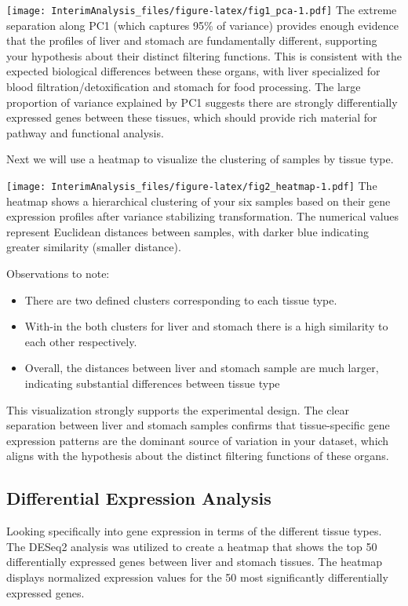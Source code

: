 \documentclass[
]{article}
\providecommand{\tightlist}{%
  \setlength{\itemsep}{0pt}\setlength{\parskip}{0pt}}
\begin{document}
\texttt{[image: InterimAnalysis\_files/figure-latex/fig1\_pca-1.pdf]} The
extreme separation along PC1 (which captures 95\% of variance) provides
enough evidence that the profiles of liver and stomach are fundamentally
different, supporting your hypothesis about their distinct filtering
functions. This is consistent with the expected biological differences
between these organs, with liver specialized for blood
filtration/detoxification and stomach for food processing. The large
proportion of variance explained by PC1 suggests there are strongly
differentially expressed genes between these tissues, which should
provide rich material for pathway and functional analysis.

Next we will use a heatmap to visualize the clustering of samples by
tissue type.

\texttt{[image: InterimAnalysis\_files/figure-latex/fig2\_heatmap-1.pdf]}
The heatmap shows a hierarchical clustering of your six samples based on
their gene expression profiles after variance stabilizing
transformation. The numerical values represent Euclidean distances
between samples, with darker blue indicating greater similarity (smaller
distance).

Observations to note:

\begin{itemize}
\tightlist
\item
  There are two defined clusters corresponding to each tissue type.
\item
  With-in the both clusters for liver and stomach there is a high
  similarity to each other respectively.
\item
  Overall, the distances between liver and stomach sample are much
  larger, indicating substantial differences between tissue type
\end{itemize}

This visualization strongly supports the experimental design. The clear
separation between liver and stomach samples confirms that
tissue-specific gene expression patterns are the dominant source of
variation in your dataset, which aligns with the hypothesis about the
distinct filtering functions of these organs.

\subsection{Differential Expression
Analysis}\label{differential-expression-analysis-1}

Looking specifically into gene expression in terms of the different
tissue types. The DESeq2 analysis was utilized to create a heatmap that
shows the top 50 differentially expressed genes between liver and
stomach tissues. The heatmap displays normalized expression values for
the 50 most significantly differentially expressed genes.
\end{document}

